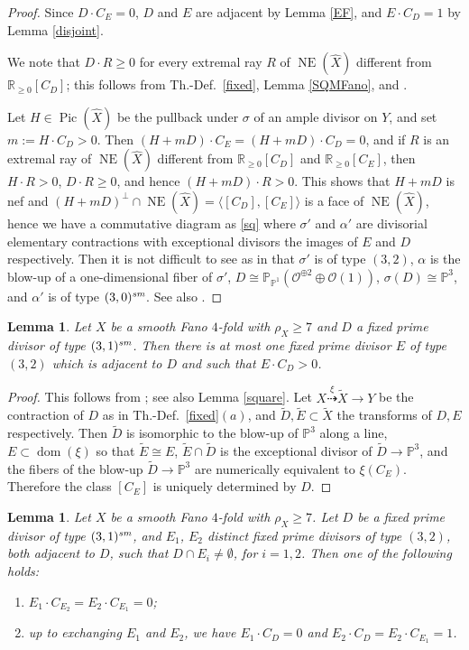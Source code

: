 \documentclass[a4paper,12pt]{amsart}
\newtheorem{lemma}[thm]{Lemma}
\theoremstyle{definition}
\numberwithin{figure}{section}
\numberwithin{table}{section}
\newcommand{\w}{\widetilde}
\newcommand{\ol}{\mathcal{O}}
\newcommand{\wi}{\widehat}
\newcommand{\pr}{\mathbb{P}}
\newcommand{\R}{\mathbb{R}}
\newcommand{\dom}{\operatorname{dom}}
\newcommand{\Pic}{\operatorname{Pic}}
\newcommand{\NE}{\operatorname{NE}}
\newcommand{\sm}{\text{\it sm}}
\begin{document}
\begin{proof}
  Since $D\cdot C_E=0$, $D$ and $E$ are adjacent by Lemma \ref{EF}, and
  $E\cdot C_D=1$ by Lemma \ref{disjoint}.

  We note that $D\cdot R\geq 0$ for every extremal ray $R$ of $\NE(\wi{X})$ different from $\R_{\geq 0}[C_D]$; this follows from Th.-Def.~\ref{fixed},
    Lemma \ref{SQMFano}, and \cite[Rem.~5.6]{blowup}.  

 Let $H\in\Pic(\wi{X})$ be the pullback under $\sigma$ of an ample divisor on $Y$, and set $m:=H\cdot C_D>0$. Then $(H+mD)\cdot C_E=
 (H+mD)\cdot C_D=0$, and if $R$ is an extremal ray of $\NE(\wi{X})$
different from $\R_{\geq 0}[C_D]$ and $\R_{\geq 0}[C_E]$,
then $H\cdot R>0$, $D\cdot R\geq 0$, and hence $(H+mD)\cdot R>0$. This shows that
$H+mD$ is nef and $(H+mD)^{\perp}\cap\NE(\wi{X})=\langle [C_D],[C_E]\rangle$ is a face of $\NE(\wi{X})$, hence we have a commutative diagram as \eqref{sq} where $\sigma'$ and $\alpha'$ are divisorial elementary contractions with exceptional divisors the images of $E$ and $D$ respectively. Then it is not difficult to see as in \cite[proof of Lemma 4.23]{small} that $\sigma'$ is of type $(3,2)$, $\alpha$ is the blow-up of a one-dimensional fiber of $\sigma'$,
$D\cong\pr_{\pr^1}(\ol^{\oplus 2}\oplus\ol(1))$, $\sigma(D)\cong\pr^3$, and $\alpha'$ is of type $(3,0)^{\sm}$. See also \cite[Lemma 2.18]{3folds}.
\end{proof}
\begin{lemma}\label{unique}
  Let $X$ be a smooth Fano $4$-fold with $\rho_X\geq 7$ and $D$ a fixed prime divisor of type $(3,1)^{\sm}$. Then there is at most one fixed prime divisor $E$ of type $(3,2)$ which is adjacent to $D$ and such that $E\cdot C_D>0$.
\end{lemma}
\begin{proof}
This follows from \cite[Lemma 4.23 and its proof]{small}; see also Lemma \ref{square}. Let $X\stackrel{\xi}{\dasharrow}\w{X}\to Y$ be the contraction of $D$ as in Th.-Def.~\ref{fixed}$(a)$, and $\w{D},\w{E}\subset\w{X}$ the transforms of $D,E$ respectively. Then $\w{D}$ is isomorphic to the blow-up of $\pr^3$ along a line, $E\subset\dom(\xi)$ so that $\w{E}\cong E$,  $\w{E}
\cap\w{D}$ is the exceptional divisor of $\w{D}\to\pr^3$, and the fibers of the blow-up  $\w{D}\to\pr^3$ are numerically equivalent to $\xi(C_E)$. Therefore the class $[C_E]$ is uniquely determined by $D$.
\end{proof}
\begin{lemma}\label{31sm}
  Let $X$ be a smooth Fano $4$-fold with $\rho_X\geq 7$. Let $D$ be a fixed prime divisor of type $(3,1)^{\sm}$, and $E_1$, $E_2$ distinct fixed prime divisors of type $(3,2)$, both adjacent to $D$, such that $D\cap E_i\neq\emptyset$, for $i=1,2$. Then one of the following holds:
  \begin{enumerate}[$(i)$]
     \item  
  $E_1\cdot C_{E_2}=E_2\cdot C_{E_1}=0$;
  \item  up to exchanging $E_1$ and $E_2$, we have
   $E_1\cdot C_D=0$ and  $E_2\cdot C_D=E_2\cdot C_{E_1}=1$.
\end{enumerate}  
\end{lemma}
\end{document}
